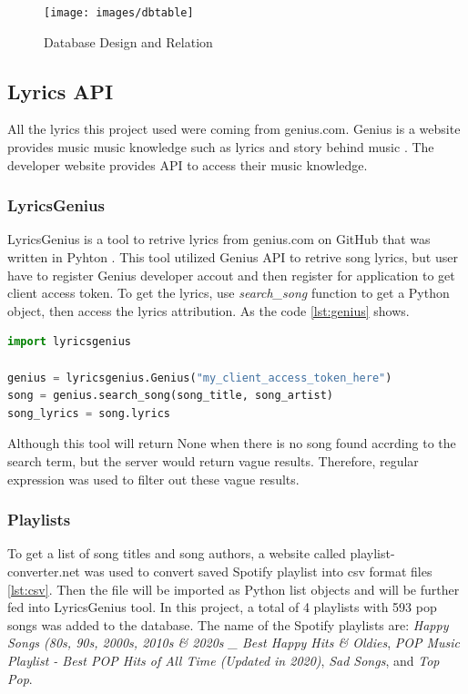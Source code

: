 \begin{figure}[htbp]
\centering
\texttt{[image: images/dbtable]}
\caption{Database Design and Relation}
\label{dbrela}
\end{figure}

\subsection{Lyrics API}

All the lyrics this project used were coming from genius.com. Genius is a website
provides music music knowledge such as lyrics and story behind music \cite{genius}.
The developer website provides API to access their music knowledge.

\subsubsection{LyricsGenius}


LyricsGenius is a tool to retrive lyrics from genius.com on GitHub that was written
in Pyhton \cite{LyricsGenius}. This tool utilized Genius API to retrive song lyrics,
but user have to register Genius developer accout and then register for application
to get client access token. To get the lyrics, use \emph{search\_song} function
to get a Python object, then access the lyrics attribution. As the code \ref{lst:genius} shows.

\begin{lstlisting}[language=Python, label={lst:genius}, caption=LyricsGenius Sample Code]
import lyricsgenius

genius = lyricsgenius.Genius("my_client_access_token_here")
song = genius.search_song(song_title, song_artist)
song_lyrics = song.lyrics
\end{lstlisting}

Although this tool will return None when there is no song found accrding to the
search term, but the server would return vague results. Therefore, regular expression
was used to filter out these vague results.

\subsubsection{Playlists}

To get a list of song titles and song authors, a website called playlist-converter.net
\cite{playlist} was used to convert saved Spotify playlist into csv format files \ref{lst:csv}.
Then the file will be imported as Python list objects and will be further fed into
LyricsGenius tool. In this project, a total of 4 playlists with 593 pop songs was
added to the database. The name of the Spotify playlists are:
\emph{Happy Songs (80s, 90s, 2000s, 2010s \& 2020s \_  Best Happy Hits \& Oldies},
\emph{POP Music Playlist - Best POP Hits of All Time (Updated in 2020)},
\emph{Sad Songs},
and \emph{Top Pop}.

